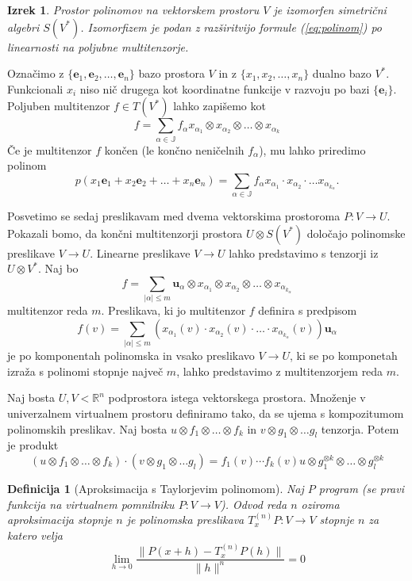 \documentclass{article}
\newcommand{\RR}{\mathbb{R}}
\newcommand{\JJ}{\mathbb{J}}
\newcommand{\e}{\mathbf{e}}
\newcommand{\uu}{\mathbf{u}}
\newtheorem{definicija}{Definicija}[section]
\newtheorem{izrek}{Izrek}[section]
\begin{document}
\begin{izrek}
  Prostor polinomov na vektorskem prostoru $V$ je izomorfen simetrični algebri
  $S(V^*)$. Izomorfizem je podan z razširitvijo formule (\ref{eq:polinom}) po
  linearnosti na poljubne multitenzorje.
\end{izrek}
Označimo z $\{\e_1,\e_2,\ldots,\e_n\}$ bazo prostora $V$ in z $\{x_1,x_2,\ldots,
x_n\}$ dualno bazo $V^*$. Funkcionali $x_i$ niso nič drugega kot koordinatne
funkcije v razvoju po bazi $\{\e_i\}$. Poljuben multitenzor $f\in T(V^*)$ lahko
zapišemo kot 
$$f = \sum_{\alpha \in \JJ}f_\alpha x_{\alpha_1}\otimes
x_{\alpha_2}\otimes\ldots \otimes x_{\alpha_k}$$
Če je multitenzor $f$ končen (le končno neničelnih $f_\alpha$),  mu lahko
priredimo polinom 
$$p(x_1\e_1+x_2\e_2+\ldots +x_n\e_n)=\sum_{\alpha \in \JJ}f_\alpha x_{\alpha_1}\cdot
x_{\alpha_2}\cdot\ldots  x_{\alpha_{k_\alpha}}.$$
 
Posvetimo se sedaj preslikavam med dvema vektorskima prostoroma $P:V\to U$.
Pokazali bomo, da končni multitenzorji prostora $U\otimes S(V^*)$ določajo
polinomske preslikave $V\to U$. Linearne preslikave $V\to U$ lahko predstavimo s
tenzorji iz $U\otimes V^*$. Naj bo 
$$f=\sum_{|\alpha|\le m}\uu_\alpha\otimes x_{\alpha_1}\otimes x_{\alpha_2}\otimes
\ldots \otimes x_{\alpha_{k_\alpha}}$$ multitenzor reda $m$. Preslikava, ki jo
multitenzor $f$ definira s predpisom 
$$f(v) = \sum_{|\alpha|\le m}\left( x_{\alpha_1}(v)\cdot x_{\alpha_2}(v)\cdot
\ldots \cdot x_{\alpha_{k_\alpha}}(v) \right)\uu_\alpha$$
je po komponentah polinomska in vsako preslikavo $V\to U$, ki se po komponetah izraža s
polinomi stopnje največ $m$, lahko predstavimo z multitenzorjem reda $m$.
  

Naj bosta $U, V < \RR^n$ podprostora istega vektorskega prostora. Množenje v
univerzalnem virtualnem prostoru definiramo tako, da se ujema s kompozitumom
polinomskih preslikav. Naj bosta $u\otimes f_1\otimes\ldots \otimes f_k$ in
$v\otimes g_1\otimes \ldots g_l$ tenzorja. Potem je produkt
\begin{equation}
  \label{eq:produkt}
 \left( u\otimes f_1\otimes\ldots \otimes f_k \right)\cdot \left(v\otimes g_1\otimes \ldots g_l\right) = f_1(v)\cdots f_k(v) u\otimes g_1^{\otimes k}\otimes \ldots \otimes g_l^{\otimes k}
\end{equation}

\begin{definicija}[Aproksimacija s Taylorjevim polinomom]
Naj $P$ program (se pravi funkcija na virtualnem pomnilniku $P:V\to V$). Odvod
reda $n$ oziroma aproksimacija stopnje $n$ je polinomska preslikava
$T^{(n)}_xP:V\to V$ stopnje $n$ za katero velja
\begin{equation}
  \label{eq:aprox}
  \lim_{h\to 0}\frac{\|P(x+h)-T^{(n)}_xP(h)\|}{\|h\|^n}=0
\end{equation}
\end{definicija}
\end{document}
